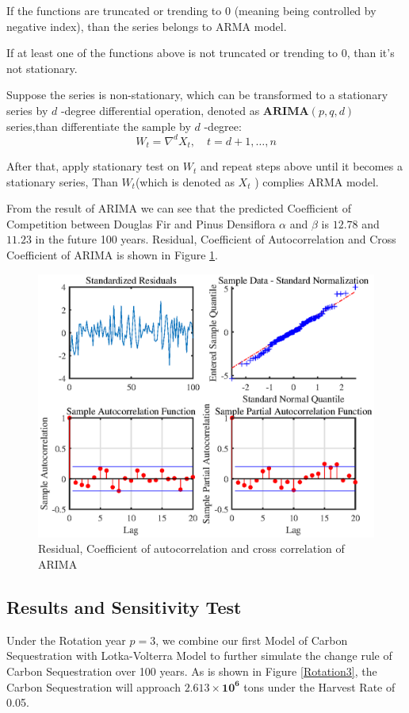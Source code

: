 \documentclass{mcmthesis}
\numberwithin{figure}{section}
\numberwithin{table}{section}
\numberwithin{equation}{section}
\begin{document}
If the functions are truncated or trending to 0 (meaning being controlled
by negative index), than the series belongs to ARMA model.
\par
If at least one of the functions above is not truncated or trending to 0, than
it's not stationary.
\par
Suppose the series is non-stationary, which can be transformed to 
a stationary series by $ d $ -degree differential operation, denoted
as $ \mathbf{ARIMA}(p,q,d) $ series,than differentiate the sample by
$ d $ -degree:
$$
  W_t = \nabla^dX_t,\quad t = d+1,\dots , n
$$ 

After that, apply stationary test on $ W_t $ and repeat steps above 
until it becomes a stationary series, Than $ W_t $(which is denoted
as $ X_t $ ) complies ARMA model. 
\par
From the result of ARIMA we can see that the predicted Coefficient of Competition
between  Douglas Fir and Pinus Densiflora $ \alpha  $ and $ \beta $ is $ \bm{12.78} $  and $ \bm{11.23}$
in the future 100 years. Residual, Coefficient of Autocorrelation and Cross Coefficient
of ARIMA is shown in Figure \ref{ARIMA Res}.

\begin{figure}[htbp]
  \centering
  \includegraphics[width = 12cm]{code&pic/ARIMA残差&自相关互相关系数.eps}
  \caption{Residual, Coefficient of autocorrelation and cross correlation of ARIMA}\label{ARIMA Res}
\end{figure}

\newpage

\subsection{Results and Sensitivity Test}\label{applicationResult}
Under the Rotation year $ p = 3 $, we combine our first Model of Carbon Sequestration
with Lotka-Volterra Model to further simulate the change rule of Carbon Sequestration 
over 100 years. As is shown in Figure \ref{Rotation3}, the Carbon Sequestration will
approach $ \bm{2.613\times 10^6} $ tons under the Harvest Rate of 0.05.
\end{document}
